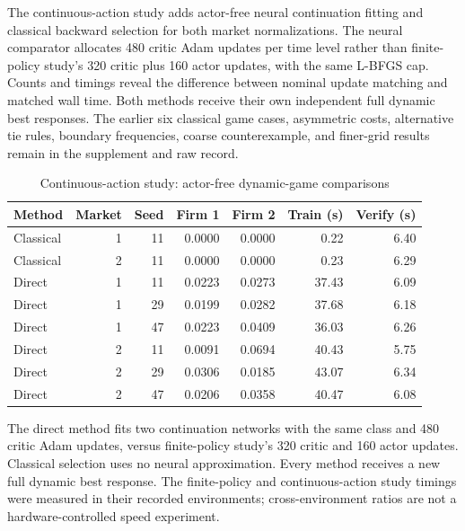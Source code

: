 The continuous-action study adds actor-free neural continuation fitting and classical backward selection for both market normalizations. The neural comparator allocates 480 critic Adam updates per time level rather than finite-policy study's 320 critic plus 160 actor updates, with the same L-BFGS cap. Counts and timings reveal the difference between nominal update matching and matched wall time. Both methods receive their own independent full dynamic best responses. The earlier six classical game cases, asymmetric costs, alternative tie rules, boundary frequencies, coarse counterexample, and finer-grid results remain in the supplement and raw record.

\begin{table}[htbp]\centering
\caption{Continuous-action study: actor-free dynamic-game comparisons}
\begin{small}\begin{tabular}{lrrrrrr}
\toprule
Method & Market & Seed & Firm 1 & Firm 2 & Train (s) & Verify (s) \\
\midrule
Classical & 1 & 11 & 0.0000 & 0.0000 & 0.22 & 6.40 \\
Classical & 2 & 11 & 0.0000 & 0.0000 & 0.23 & 6.29 \\
Direct & 1 & 11 & 0.0223 & 0.0273 & 37.43 & 6.09 \\
Direct & 1 & 29 & 0.0199 & 0.0282 & 37.68 & 6.18 \\
Direct & 1 & 47 & 0.0223 & 0.0409 & 36.03 & 6.26 \\
Direct & 2 & 11 & 0.0091 & 0.0694 & 40.43 & 5.75 \\
Direct & 2 & 29 & 0.0306 & 0.0185 & 43.07 & 6.34 \\
Direct & 2 & 47 & 0.0206 & 0.0358 & 40.47 & 6.08 \\
\bottomrule\end{tabular}\end{small}
\par\smallskip\begin{minipage}{0.96\linewidth}\footnotesize The direct method fits two continuation networks with the same class and 480 critic Adam updates, versus finite-policy study's 320 critic and 160 actor updates. Classical selection uses no neural approximation. Every method receives a new full dynamic best response. The finite-policy and continuous-action study timings were measured in their recorded environments; cross-environment ratios are not a hardware-controlled speed experiment.\end{minipage}
\end{table}


